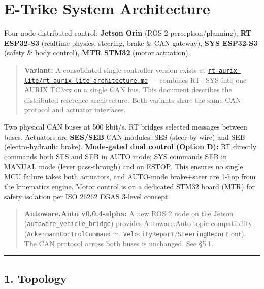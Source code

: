 \chapter{E-Trike System Architecture}\label{e-trike-system-architecture}

Four-node distributed control: \textbf{Jetson Orin} (ROS 2 perception/planning),
\textbf{RT ESP32-S3} (realtime physics, steering, brake \& CAN gateway),
\textbf{SYS ESP32-S3} (safety \& body control), \textbf{MTR STM32} (motor
actuation).

\begin{quote}
\textbf{Variant:} A consolidated single-controller version exists at
\href{rt-aurix-lite/rt-aurix-lite-architecture.md}{\texttt{rt-aurix-lite/rt-aurix-lite-architecture.md}}
--- combines RT+SYS into one AURIX TC3xx on a single CAN bus. This document
describes the distributed reference architecture. Both variants share the same
CAN protocol and actuator interfaces.
\end{quote}

Two physical CAN buses at 500 kbit/s. RT bridges selected messages between
buses. Actuators are \textbf{SES/SEB} CAN modules: SES (steer-by-wire) and SEB
(electro-hydraulic brake). \textbf{Mode-gated dual control (Option D):} RT
directly commands both SES and SEB in AUTO mode; SYS commands SEB in MANUAL
mode (lever pass-through) and on ESTOP. This ensures no single MCU failure takes
both actuators, and AUTO-mode brake+steer are 1-hop from the kinematics engine.
Motor control is on a dedicated STM32 board (MTR) for safety isolation per ISO
26262 EGAS 3-level concept.

\begin{quote}
\textbf{Autoware.Auto v0.0.4-alpha:} A new ROS 2 node on the Jetson
(\texttt{autoware\_vehicle\_bridge}) provides Autoware.Auto topic compatibility
(\texttt{AckermannControlCommand} in,
\texttt{VelocityReport}/\texttt{SteeringReport} out). The CAN protocol across
both buses is unchanged. See §5.1.
\end{quote}

\begin{center}\rule{0.5\linewidth}{0.5pt}\end{center}

\section{1. Topology}\label{topology}


